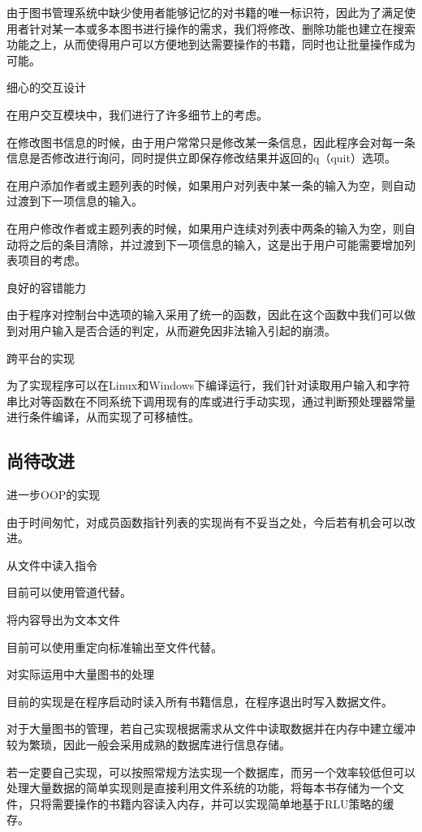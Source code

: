 \begin{DoxyEnumerate}
由于图书管理系统中缺少使用者能够记忆的对书籍的唯一标识符，因此为了满足使用者针对某一本或多本图书进行操作的需求，我们将修改、删除功能也建立在搜索功能之上，从而使得用户可以方便地到达需要操作的书籍，同时也让批量操作成为可能。
\item 细心的交互设计

在用户交互模块中，我们进行了许多细节上的考虑。
\begin{DoxyItemize}
\item 在修改图书信息的时候，由于用户常常只是修改某一条信息，因此程序会对每一条信息是否修改进行询问，同时提供立即保存修改结果并返回的{\ttfamily q}（quit）选项。
\item 在用户添加作者或主题列表的时候，如果用户对列表中某一条的输入为空，则自动过渡到下一项信息的输入。
\item 在用户修改作者或主题列表的时候，如果用户连续对列表中两条的输入为空，则自动将之后的条目清除，并过渡到下一项信息的输入，这是出于用户可能需要增加列表项目的考虑。
\end{DoxyItemize}
\item 良好的容错能力

由于程序对控制台中选项的输入采用了统一的函数，因此在这个函数中我们可以做到对用户输入是否合适的判定，从而避免因非法输入引起的崩溃。
\item 跨平台的实现

为了实现程序可以在{\ttfamily Linux}和{\ttfamily Windows}下编译运行，我们针对读取用户输入和字符串比对等函数在不同系统下调用现有的库或进行手动实现，通过判断预处理器常量进行条件编译，从而实现了可移植性。
\end{DoxyEnumerate}

\subsection*{尚待改进}


\begin{DoxyEnumerate}
\item 进一步{\ttfamily O\-O\-P}的实现

由于时间匆忙，对成员函数指针列表的实现尚有不妥当之处，今后若有机会可以改进。
\item 从文件中读入指令

目前可以使用管道代替。
\item 将内容导出为文本文件

目前可以使用重定向标准输出至文件代替。
\item 对实际运用中大量图书的处理

目前的实现是在程序启动时读入所有书籍信息，在程序退出时写入数据文件。

对于大量图书的管理，若自己实现根据需求从文件中读取数据并在内存中建立缓冲较为繁琐，因此一般会采用成熟的数据库进行信息存储。

若一定要自己实现，可以按照常规方法实现一个数据库，而另一个效率较低但可以处理大量数据的简单实现则是直接利用文件系统的功能，将每本书存储为一个文件，只将需要操作的书籍内容读入内存，并可以实现简单地基于{\ttfamily R\-L\-U}策略的缓存。 
\end{DoxyEnumerate}